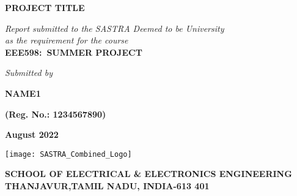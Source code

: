 \documentclass[a4paper, 12pt, oneside]{sastra1}
\begin{document}
\onehalfspacing
	
	\thispagestyle{empty}
	\begin{center}
		\Large{\textbf{PROJECT TITLE}}
	\end{center}
	\bigskip{}
	\bigskip{}
	\bigskip{}
	\begin{center}
		\textit{Report submitted to the SASTRA Deemed to be University\\ 
			as the requirement for the course\\
		}
		\bigskip{}
		\bigskip{}
		\large{\textbf{EEE598:~SUMMER PROJECT}}
		\bigskip{}
		\bigskip{}
		\bigskip{}
		\bigskip{}
		\bigskip{}
		\bigskip{}
	\end{center}
	\begin{center}
		\textit{Submitted by}\\
	\end{center}
	\begin{center}
		\begin{singlespacing}
				\textbf{\Large{NAME1}}
			
			\textbf{\large{(Reg. No.: 1234567890)}}
		
		\end{singlespacing}
	\end{center}
	\bigskip{}
	
	\begin{center}
		\Large{\textbf{August 2022}}   %
	\end{center}
	\bigskip{}
	\begin{center}
		\texttt{[image: SASTRA\_Combined\_Logo]}
	\end{center}
	
	\begin{center}
		\large{\textbf{SCHOOL OF ELECTRICAL \& ELECTRONICS ENGINEERING}} %
		{\textbf{THANJAVUR,TAMIL NADU, INDIA-613 401}}
	\end{center}
	
	
	\newpage
	
	\setcounter{page}{2}
	
	\certificate
	
	
\end{document}
